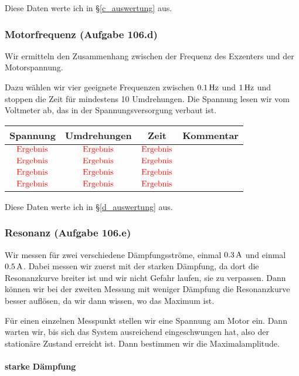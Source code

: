 \documentclass[11pt]{article}
\newcommand{\ergebnis}{\textcolor{red}{\mathrm{Ergebnis}}}
\begin{document}
Diese Daten werte ich in §\ref{c_auswertung} aus.

\subsubsection{Motorfrequenz (Aufgabe 106.d)}
\label{d_durchführung}

Wir ermitteln den Zusammenhang zwischen der Frequenz des Exzenters und der
Motorspannung.

Dazu wählen wir vier geeignete Frequenzen zwischen $\unit[0.1]{Hz}$ und
$\unit[1]{Hz}$ und stoppen die Zeit für mindestens 10 Umdrehungen. Die Spannung
lesen wir vom Voltmeter ab, das in der Spannungsversorgung verbaut ist.

\begin{tabular}{cccr}
	Spannung & Umdrehungen & Zeit & Kommentar \\
	\hline
	$\ergebnis$ & $\ergebnis$ & $\ergebnis$ & \\
	$\ergebnis$ & $\ergebnis$ & $\ergebnis$ & \\
	$\ergebnis$ & $\ergebnis$ & $\ergebnis$ & \\
	$\ergebnis$ & $\ergebnis$ & $\ergebnis$ & \\
\end{tabular}

Diese Daten werte ich in §\ref{d_auswertung} aus.

\subsubsection{Resonanz (Aufgabe 106.e)}
\label{e_durchführung}

Wir messen für zwei verschiedene Dämpfungsströme, einmal $\unit[0.3]A$ und
einmal $\unit[0.5]A$. Dabei messen wir zuerst mit der starken Dämpfung, da dort
die Resonanzkurve breiter ist und wir nicht Gefahr laufen, sie zu verpassen.
Dann können wir bei der zweiten Messung mit weniger Dämpfung die Resonanzkurve
besser auflösen, da wir dann wissen, wo das Maximum ist.

Für einen einzelnen Messpunkt stellen wir eine Spannung am Motor ein. Dann
warten wir, bis sich das System ausreichend eingeschwungen hat, also der
stationäre Zustand erreicht ist. Dann bestimmen wir die Maximalamplitude.

\paragraph{starke Dämpfung}
\end{document}
